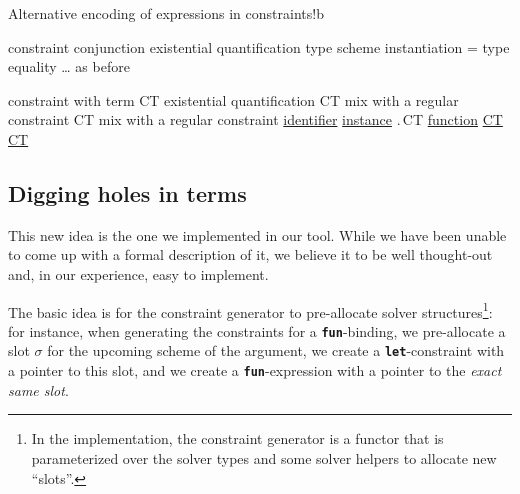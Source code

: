 \documentclass[10pt,a4paper,twoside,titlepage,twocolumn]{article}
\newcommand{\code}[1]{\textbf{\texttt{#1}}}
\begin{document}
\begin{TTCOMPONENT}{Alternative encoding of expressions in constraints\label{fig:bad_idea}}{}{!b}
  \let \\ \TTSyntaxAlternative%

         {constraint} \\
  {\co \wedge \co}                     {conjunction} \\
  {\cexists\tvars\co}                  {existential quantification} \\
  {\ccall\evid\ttyp}                   {type scheme instantiation}\\
  {\ttyp = \ttyp}                      {type equality} \\
  {…}                                  {as before}

  \columnbreak %

       {constraint with term} \\
  {\cexists\tvars CT}                  {existential quantification} \\
  {CT \wedge\co}                  {mix with a regular constraint} \\
  {\co\wedge CT}                  {mix with a regular constraint} \\
  {\underline{\evid}}                  {\underline{identifier}} \\
  {\ccall{\underline{\evid}}\ttyp}                  {\underline{instance}} \\
  {\underline{\efun\evar\ttyp}.\,CT}                  {\underline{function}} \\
  {\underline{CT}\,\,\underline{CT}} {\underline{}} \\
  {\underline{}} {\underline{\smash{\code{let}-binding}}}

  \extraspacehack{.07in}
\end{TTCOMPONENT}

\subsection{Digging holes in terms}

This new idea is the one we implemented in our tool. While we have been unable
to come up with a formal description of it, we believe it to be well thought-out
and, in our experience, easy to implement.

The basic idea is for the constraint generator to pre-allocate solver
structures\footnote{In the implementation, the constraint generator is a functor
that is parameterized over the solver types and some solver helpers to allocate
new ``slots''.}: for instance, when generating the constraints for a
\code{fun}-binding, we pre-allocate a slot $\sigma$ for the upcoming scheme of
the argument, we create a \code{let}-constraint with a pointer to this slot, and
we create a \code{fun}-expression with a pointer to the \emph{exact same slot}.
\end{document}
